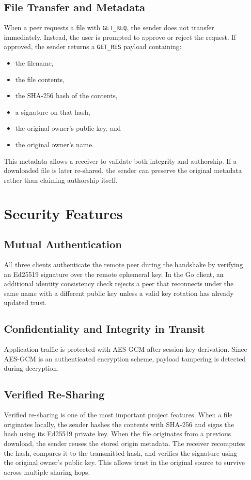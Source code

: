 \documentclass[sigconf,nonacm]{acmart}
\begin{document}
\subsection{File Transfer and Metadata}
When a peer requests a file with \texttt{GET\_REQ}, the sender does not
transfer immediately. Instead, the user is prompted to approve or reject
the request. If approved, the sender returns a \texttt{GET\_RES} payload
containing:
\begin{itemize}
\item the filename,
\item the file contents,
\item the SHA-256 hash of the contents,
\item a signature on that hash,
\item the original owner's public key, and
\item the original owner's name.
\end{itemize}

This metadata allows a receiver to validate both integrity and authorship.
If a downloaded file is later re-shared, the sender can preserve the
original metadata rather than claiming authorship itself.

\section{Security Features}
\subsection{Mutual Authentication}
All three clients authenticate the remote peer during the handshake by
verifying an Ed25519 signature over the remote ephemeral key. In the Go
client, an additional identity consistency check rejects a peer that
reconnects under the same name with a different public key unless a valid
key rotation has already updated trust.

\subsection{Confidentiality and Integrity in Transit}
Application traffic is protected with AES-GCM after session key
derivation. Since AES-GCM is an authenticated encryption scheme, payload
tampering is detected during decryption.

\subsection{Verified Re-Sharing}
Verified re-sharing is one of the most important project features. When a
file originates locally, the sender hashes the contents with SHA-256 and
signs the hash using its Ed25519 private key. When the file originates
from a previous download, the sender reuses the stored origin metadata.
The receiver recomputes the hash, compares it to the transmitted hash, and
verifies the signature using the original owner's public key. This allows
trust in the original source to survive across multiple sharing hops.
\end{document}
